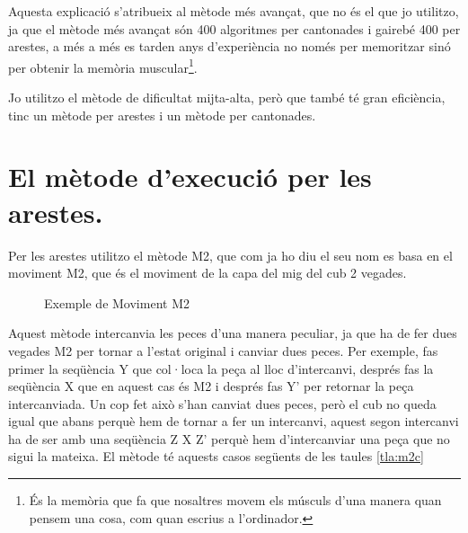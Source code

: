Aquesta explicació s'atribueix al mètode més avançat, que no és el que jo utilitzo, ja que el mètode més avançat són 400 algoritmes per cantonades i gairebé 400 per arestes, a més a més es tarden anys d'experiència no només per memoritzar sinó per obtenir la memòria muscular\footnote{És la memòria que fa que nosaltres movem els músculs d'una manera quan pensem una cosa, com quan escrius a l'ordinador.}.

Jo utilitzo el mètode de dificultat mijta-alta, però que també té gran eficiència, tinc un mètode per arestes i un mètode per cantonades.

\section{El mètode d'execució per les arestes.}

Per les arestes utilitzo el mètode M2, que com ja ho diu el seu nom es basa en el moviment M2, que és el moviment de la capa del mig del cub 2 vegades.

\begin{figure}[h]
    \centering\RubikCubeSolvedWY
    \caption{Exemple de Moviment M2}
\end{figure}
    
Aquest mètode intercanvia les peces d'una manera peculiar, ja que ha de fer dues vegades M2 per tornar a l'estat original i canviar dues peces. Per exemple, fas primer la seqüència Y que col·loca la peça al lloc d'intercanvi, després fas la seqüència X que en aquest cas és M2 i després fas Y' per retornar la peça intercanviada. Un cop fet això s'han canviat dues peces, però el cub no queda igual que abans perquè hem de tornar a fer un intercanvi, aquest segon intercanvi ha de ser amb una seqüència Z X Z' perquè hem d'intercanviar una peça que no sigui la mateixa.
El mètode té aquests casos següents de les taules \ref{tla:m2c}

